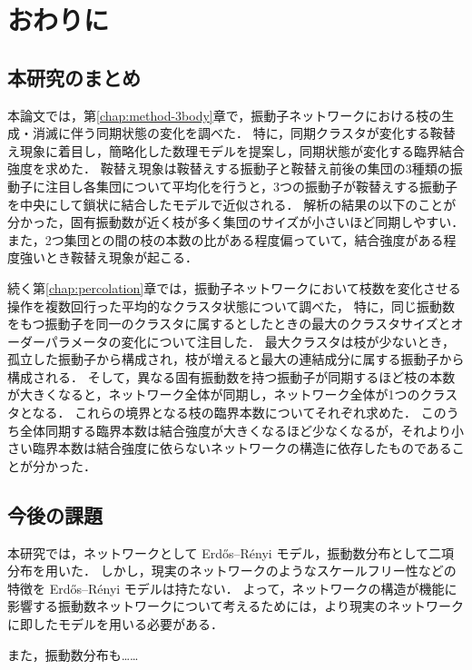 \documentclass[../main]{subfiles}
\begin{document}
\chapter{おわりに}
\label{chap:summary}
\section{本研究のまとめ}
本論文では，第\ref{chap:method-3body}章で，振動子ネットワークにおける枝の生成・消滅に伴う同期状態の変化を調べた．
特に，同期クラスタが変化する鞍替え現象に着目し，簡略化した数理モデルを提案し，同期状態が変化する臨界結合強度を求めた．
鞍替え現象は鞍替えする振動子と鞍替え前後の集団の3種類の振動子に注目し各集団について平均化を行うと，3つの振動子が鞍替えする振動子を中央にして鎖状に結合したモデルで近似される．
解析の結果の以下のことが分かった，固有振動数が近く枝が多く集団のサイズが小さいほど同期しやすい．
また，2つ集団との間の枝の本数の比がある程度偏っていて，結合強度がある程度強いとき鞍替え現象が起こる．

続く第\ref{chap:percolation}章では，振動子ネットワークにおいて枝数を変化させる操作を複数回行った平均的なクラスタ状態について調べた，
特に，同じ振動数をもつ振動子を同一のクラスタに属するとしたときの最大のクラスタサイズとオーダーパラメータの変化について注目した．
最大クラスタは枝が少ないとき，孤立した振動子から構成され，枝が増えると最大の連結成分に属する振動子から構成される．
そして，異なる固有振動数を持つ振動子が同期するほど枝の本数が大きくなると，ネットワーク全体が同期し，ネットワーク全体が1つのクラスタとなる．
これらの境界となる枝の臨界本数についてそれぞれ求めた．
このうち全体同期する臨界本数は結合強度が大きくなるほど少なくなるが，それより小さい臨界本数は結合強度に依らないネットワークの構造に依存したものであることが分かった．
\section{今後の課題}
本研究では，ネットワークとして Erdős–Rényi モデル，振動数分布として二項分布を用いた．
しかし，現実のネットワークのようなスケールフリー性などの特徴を Erdős–Rényi モデルは持たない．
よって，ネットワークの構造が機能に影響する振動数ネットワークについて考えるためには，より現実のネットワークに即したモデルを用いる必要がある．

また，振動数分布も……
\end{document}
